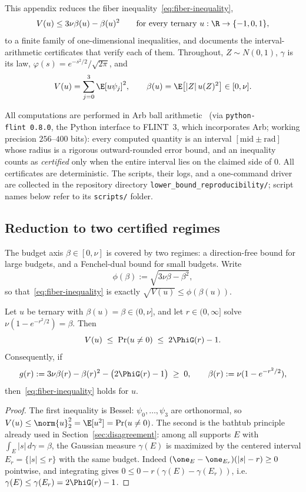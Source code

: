 This appendix reduces the fiber inequality~\eqref{eq:fiber-inequality},
\[
        V(u)\le 3\nu\beta(u)-\beta(u)^2
        \qquad\text{for every ternary } u:\R\to\{-1,0,1\},
\]
to a finite family of one-dimensional inequalities, and documents the interval-arithmetic certificates that verify each of them. Throughout, $Z\sim N(0,1)$, $\gamma$ is its law, $\varphi(s)=e^{-s^2/2}/\sqrt{2\pi}$, and
\[
        V(u)=\sum_{j=0}^3\E[u\psi_j]^2,
        \qquad
        \beta(u)=\E\bigl[|Z|\,u(Z)^2\bigr]\in[0,\nu].
\]

All computations are performed in Arb ball arithmetic~\cite{johansson2017arb} (via \texttt{python-flint~0.8.0}, the Python interface to FLINT~3, which incorporates Arb; working precision $256$--$400$ bits): every computed quantity is an interval $[\text{mid}\pm\text{rad}]$ whose radius is a rigorous outward-rounded error bound, and an inequality counts as \emph{certified} only when the entire interval lies on the claimed side of $0$. All certificates are deterministic. The scripts, their logs, and a one-command driver are collected in the repository directory \texttt{lower\_bound\_reproducibility/}; script names below refer to its \texttt{scripts/} folder.

\subsection{Reduction to two certified regimes}
\label{app:fq1-reduction}

The budget axis $\beta\in[0,\nu]$ is covered by two regimes: a direction-free bound for large budgets, and a Fenchel-dual bound for small budgets. Write
\[
        \phi(\beta):=\sqrt{3\nu\beta-\beta^2},
\]
so that~\eqref{eq:fiber-inequality} is exactly $\sqrt{V(u)}\le\phi(\beta(u))$.

\begin{lemma}\label{lem:highbudget}
Let $u$ be ternary with $\beta(u)=\beta\in(0,\nu]$, and let $r\in(0,\infty]$ solve $\nu(1-e^{-r^2/2})=\beta$. Then
\[
        V(u)\;\le\;\Pr(u\neq0)\;\le\;2\PhiG(r)-1 .
\]
Consequently, if
\begin{equation}
        g(r):=3\nu\beta(r)-\beta(r)^2-\bigl(2\PhiG(r)-1\bigr)\;\ge\;0,
        \qquad \beta(r):=\nu(1-e^{-r^2/2}),
        \label{eq:g-def}
\end{equation}
then~\eqref{eq:fiber-inequality} holds for $u$.
\end{lemma}

\begin{proof}
The first inequality is Bessel: $\psi_0,\ldots,\psi_3$ are orthonormal, so $V(u)\le\norm{u}_2^2=\E[u^2]=\Pr(u\neq0)$. The second is the bathtub principle already used in Section~\ref{sec:disagreement}: among all supports $E$ with $\int_E|s|\,d\gamma=\beta$, the Gaussian measure $\gamma(E)$ is maximized by the centered interval $E_r=\{|s|\le r\}$ with the same budget. Indeed $(\one_E-\one_{E_r})(|s|-r)\ge0$ pointwise, and integrating gives $0\le 0-r(\gamma(E)-\gamma(E_r))$, i.e.\ $\gamma(E)\le\gamma(E_r)=2\PhiG(r)-1$.
\end{proof}

